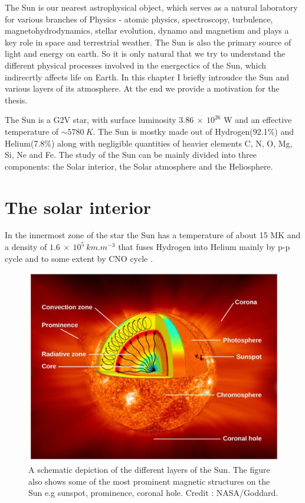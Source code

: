 

The Sun is our nearest astrophysical object, which serves as a natural laboratory for various branches of Physics - atomic physics, spectroscopy, turbulence, magnetohydrodynamics, stellar evolution, dynamo and magnetism and plays a key role in space and terrestrial weather. The Sun is also the primary source of light and energy on earth. So it is only natural that we try to understand the different physical processes involved in the energectics of the Sun, which indirecrtly affects life on Earth. In this chapter I briefly introudce the Sun and various layers of its atmosphere. At the end we provide a motivation for the thesis.

The Sun is a G2V star, with surface luminosity $3.86~\times~10^{26}$ W and an effective temperature of $\sim 5780~K$. The Sun is mostky made out of Hydrogen(92.1\%) and Helium(7.8\%) along with negligible quantities of heavier elements C, N, O, Mg, Si, Ne and Fe. The study of the Sun can be mainly divided into three components: the Solar interior, the Solar atmosphere and the Heliosphere.

\section{The solar interior}\label{solar_int}

In the innermost zone of the star the Sun has a temperature of about 15 MK and a density of $1.6~\times~10^{5}~km.m^{-3}$ that fuses Hydrogen into Helium mainly by p-p cycle \citep{bethe38} and to some extent by CNO cycle \citep{bethe39}. 

\begin{figure}[h!]
    \centering
    \includegraphics[width = 0.8\linewidth]{Figures/solar_int.png}
    \caption{A schematic depiction of the different layers of the Sun. The figure also shows some of the most prominent magnetic structures on the Sun e.g sunspot, prominence, coronal hole. Credit : NASA/Goddard.}
    \label{fig_solar_int}
\end{figure}

